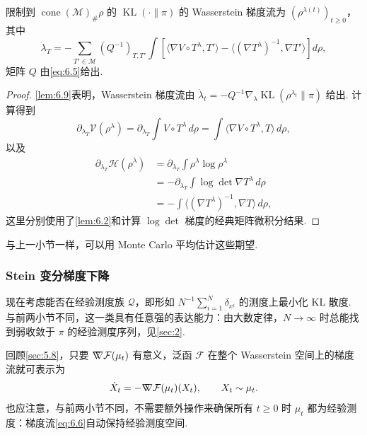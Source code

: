 \begin{theorem}\label{thm:6.10}
限制到 $\operatorname{cone}(\mathcal M)_\#\rho$ 的 $\operatorname{KL}(\cdot\|\pi)$ 的 Wasserstein 梯度流为 $(\rho^{\lambda(t)})_{t\geq0}$，其中
$$
\dot\lambda_T=-\sum_{T'\in\mathcal M}(Q^{-1})_{T,T'}
\int\left[\langle\nabla V\circ T^\lambda,T'\rangle
-\langle(\nabla T^\lambda)^{-1},\nabla T'\rangle\right]d\rho,
$$
矩阵 $Q$ 由\eqref{eq:6.5}给出.
\end{theorem}
\begin{proof}
\autoref{lem:6.9}表明，Wasserstein 梯度流由 $\dot\lambda_t=-Q^{-1}\nabla_\lambda\operatorname{KL}(\rho^{\lambda_t}\|\pi)$ 给出. 计算得到
$$
\partial_{\lambda_T}\mathcal V(\rho^\lambda)
=\partial_{\lambda_T}\int V\circ T^\lambda\,d\rho
=\int\langle\nabla V\circ T^\lambda,T\rangle\,d\rho,
$$
以及
$$
\begin{aligned}
\partial_{\lambda_T}\mathcal H(\rho^\lambda)
&=\partial_{\lambda_T}\int\rho^\lambda\log\rho^\lambda\\
&=-\partial_{\lambda_T}\int\log\det\nabla T^\lambda\,d\rho\\
&=-\int\langle(\nabla T^\lambda)^{-1},\nabla T\rangle\,d\rho,
\end{aligned}
$$
这里分别使用了\autoref{lem:6.2}和计算 $\log\det$ 梯度的经典矩阵微积分结果.
\end{proof}

与上一小节一样，可以用 Monte Carlo 平均估计这些期望.

\subsubsection{Stein 变分梯度下降}\label{sec:6.1.4}

现在考虑能否在经验测度族 $\mathcal Q$，即形如 $N^{-1}\sum_{i=1}^N\delta_{x^i}$ 的测度上最小化 KL 散度. 与前两小节不同，这一类具有任意强的表达能力：由大数定律，$N\to\infty$ 时总能找到弱收敛于 $\pi$ 的经验测度序列，见\autoref{sec:2}.

回顾\autoref{sec:5.8}，只要 $\nabla\mkern-10mu\nabla\mathcal F(\mu_t)$ 有意义，泛函 $\mathcal F$ 在整个 Wasserstein 空间上的梯度流就可表示为
\begin{equation}\label{eq:6.6}
\dot X_t=-\nabla\mkern-10mu\nabla\mathcal F(\mu_t)(X_t),\qquad X_t\sim\mu_t.
\end{equation}
也应注意，与前两小节不同，不需要额外操作来确保所有 $t\geq0$ 时 $\mu_t$ 都为经验测度：梯度流\eqref{eq:6.6}自动保持经验测度空间.

